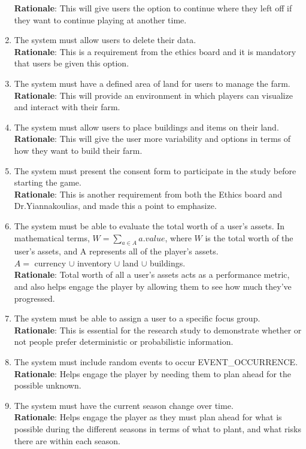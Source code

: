 \documentclass{article}
\begin{document}
\begin{enumerate}[{FR}1. ]
    \textbf{Rationale}: This will give users the option to continue where they left off if they want to continue playing at another time.
    \item \label{FR15} The system must allow users to delete their data.\\
    \textbf{Rationale}: This is a requirement from the ethics board and it is mandatory that users be given this option.
    \item \label{FR16} The system must have a defined area of land for users to manage the farm.\\
    \textbf{Rationale}: This will provide an environment in which players can visualize and interact with their farm.
    \item \label{FR17} The system must allow users to place buildings and items on their land.\\
    \textbf{Rationale}: This will give the user more variability and options in terms of how they want to build their farm.
    \item \label{FR18} The system must present the consent form to participate in the study before starting the game.\\
    \textbf{Rationale}: This is another requirement from both the Ethics board and Dr.Yiannakoulias, and made this a point to emphasize.
    \item \label{FR19} The system must be able to evaluate the total worth of a user's assets. In mathematical terms, $W = \displaystyle\sum_{a \in A}^{}a.value$, where $W$ is the total worth of the user's assets, and A represents all of the player's assets. \\ $A = $ currency $ \cup $ inventory $ \cup $ land $ \cup $ buildings.  \\
    \textbf{Rationale}: Total worth of all a user's assets acts as a performance metric, and also helps engage the player by allowing them to see how much they've progressed.
    \item \label{FR20} The system must be able to assign a user to a specific focus group.\\
    \textbf{Rationale}: This is essential for the research study to demonstrate whether or not people prefer deterministic or probabilistic information.
    \item \label{FR21} The system must include random events to occur EVENT\_OCCURRENCE.\\
    \textbf{Rationale}: Helps engage the player by needing them to plan ahead for the possible unknown.
    \item \label{FR22} The system must have the current season change over time.\\
    \textbf{Rationale}: Helps engage the player as they must plan ahead for what is possible during the different seasons in terms of what to plant, and what risks there are within each season.
\end{enumerate}
\end{document}
